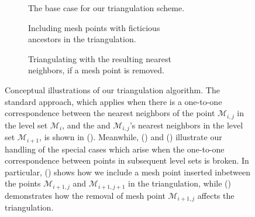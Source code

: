 \begin{figure}[htpb]
    \centering
    \begin{subfigure}[b]{0.55\textwidth}
        \centering
        \resizebox{0.9\linewidth}{!}%
        {}
        \caption[]{{\small The base case for our triangulation scheme.}}
        \label{fig:triangulation_basecase}
    \end{subfigure}

    \begin{subfigure}[b]{0.475\textwidth}
        \centering
        \resizebox{0.9\linewidth}{!}%
        {}
        \caption[]{{\small Including mesh points with ficticious
        \\\phantom{(b)} ancestors in the triangulation.}}
        \label{fig:triangulation_pointinserted}
    \end{subfigure}
    \begin{subfigure}[b]{0.475\textwidth}
        \centering
        \resizebox{0.9\linewidth}{!}%
        {}
        \caption[]{{\small Triangulating with the resulting nearest
        \\\phantom{(c)} neighbors, if a mesh point is removed.}}
        \label{fig:triangulation_pointremoved}
    \end{subfigure}
    \caption[Conceptual illustrations of our triangulation algorithm]
    {Conceptual illustrations of our triangulation algorithm. The standard
        approach, which applies when there is a one-to-one correspondence
        between the nearest neighbors of the point $\mathcal{M}_{i,j}$ in the
        level set $\mathcal{M}_{i}$, and the and $\mathcal{M}_{i,j}$'s nearest
        neighbors in the level set $\mathcal{M}_{i+1}$, is shown in
        (). Meanwhile,
        () and
        () illustrate our handling of
        the special cases which arise when the one-to-one correspondence
        between points in subsequent level sets is broken. In particular,
        () shows how we include
        a mesh point inserted inbetween the points $\mathcal{M}_{i+1,j}$
        and $\mathcal{M}_{i+1,j+1}$ in the triangulation, while
        () demonstrates how the removal
        of mesh point $\mathcal{M}_{i+1,j}$ affects the triangulation.
}
\end{figure}
